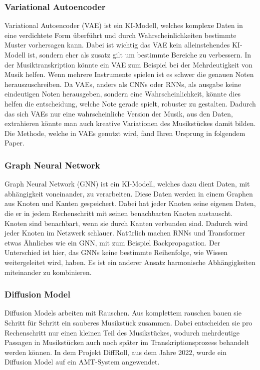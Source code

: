\subsubsection*{Variational Autoencoder}
Variational Autoencoder (VAE) ist ein KI-Modell, welches komplexe Daten in eine verdichtete Form überführt
und durch Wahrscheinlichkeiten bestimmte Muster vorhersagen kann\cite{kingma2019introduction}.
Dabei ist wichtig das VAE kein alleinstehendes KI-Modell ist,
sondern eher als zusatz gilt um bestimmte Bereiche zu verbessern.
In der Musiktranskription könnte ein VAE zum Beispiel bei der Mehrdeutigkeit von Musik helfen.
Wenn mehrere Instrumente spielen ist es schwer die genauen Noten herauszuschreiben.
Da VAEs, anders als CNNs oder RNNs, als ausgabe keine eindeutigen Noten herausgeben,
sondern eine Wahrscheinlichkeit, könnte dies helfen die entscheidung, welche Note gerade spielt, robuster zu gestalten.
Dadurch das sich VAEs nur eine wahrscheinliche Version der Musik, aus den Daten,
extrahieren könnte man auch kreative Variationen des Musikstückes damit bilden.
Die Methode, welche in VAEs genutzt wird, fand Ihren Ursprung in folgendem Paper\cite{kingma2013auto}.

\subsubsection*{Graph Neural Network}
Graph Neural Network (GNN) ist ein KI-Modell, welches dazu dient Daten, mit abhängigkeit voneinander, zu verarbeiten.
Diese Daten werden in einem Graphen aus Knoten und Kanten gespeichert.
Dabei hat jeder Knoten seine eigenen Daten, die er in jedem Rechenschritt mit seinen benachbarten Knoten austauscht.
Knoten sind benachbart, wenn sie durch Kanten verbunden sind.
Dadurch wird jeder Knoten im Netzwerk schlauer.
Natürlich machen RNNs und Transformer etwas Ähnliches wie ein GNN, mit zum Beispiel Backpropagation.
Der Unterschied ist hier, das GNNs keine bestimmte Reihenfolge, wie Wissen weitergeleitet wird, haben.
Es ist ein anderer Ansatz harmonische Abhängigkeiten miteinander zu kombinieren\cite{wu2020comprehensive}.

\subsubsection*{Diffusion Model}
Diffusion Models arbeiten mit Rauschen.
Aus komplettem rauschen bauen sie Schritt für Schritt ein sauberes Musikstück zusammen.
Dabei entscheiden sie pro Rechenschritt nur einen kleinen Teil des Musikstückes,
wodurch mehrdeutige Passagen in Musikstücken auch noch später im Transkriptionsprozess behandelt werden können.
In dem Projekt DiffRoll, aus dem Jahre 2022, wurde ein Diffusion Model auf ein AMT-System angewendet\cite{cheuk2022diffroll}.

